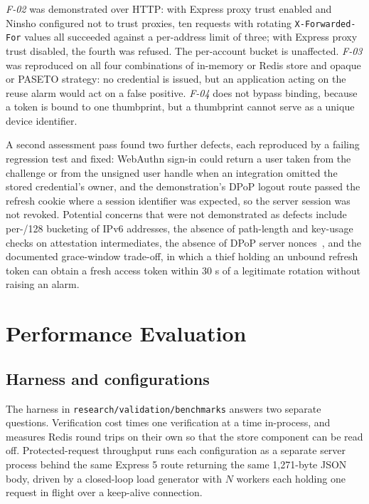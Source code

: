 \documentclass[conference]{IEEEtran}
\begin{document}
\emph{F-02} was demonstrated over HTTP: with Express proxy trust enabled and Ninsho configured not to trust proxies, ten requests with rotating \texttt{X-Forwarded-For} values all succeeded against a per-address limit of three; with Express proxy trust disabled, the fourth was refused. The per-account bucket is unaffected. \emph{F-03} was reproduced on all four combinations of in-memory or Redis store and opaque or PASETO strategy: no credential is issued, but an application acting on the reuse alarm would act on a false positive. \emph{F-04} does not bypass binding, because a token is bound to one thumbprint, but a thumbprint cannot serve as a unique device identifier.

A second assessment pass found two further defects, each reproduced by a failing regression test and fixed: WebAuthn sign-in could return a user taken from the challenge or from the unsigned user handle when an integration omitted the stored credential's owner, and the demonstration's DPoP logout route passed the refresh cookie where a session identifier was expected, so the server session was not revoked. Potential concerns that were not demonstrated as defects include per-/128 bucketing of IPv6 addresses, the absence of path-length and key-usage checks on attestation intermediates, the absence of DPoP server nonces~\cite{rfc9449}, and the documented grace-window trade-off, in which a thief holding an unbound refresh token can obtain a fresh access token within 30 s of a legitimate rotation without raising an alarm.

\section{Performance Evaluation}
\label{sec:performance}

\subsection{Harness and configurations}
The harness in \texttt{research/validation/benchmarks} answers two separate questions. Verification cost times one verification at a time in-process, and measures Redis round trips on their own so that the store component can be read off. Protected-request throughput runs each configuration as a separate server process behind the same Express 5 route returning the same 1,271-byte JSON body, driven by a closed-loop load generator with $N$ workers each holding one request in flight over a keep-alive connection.
\end{document}
